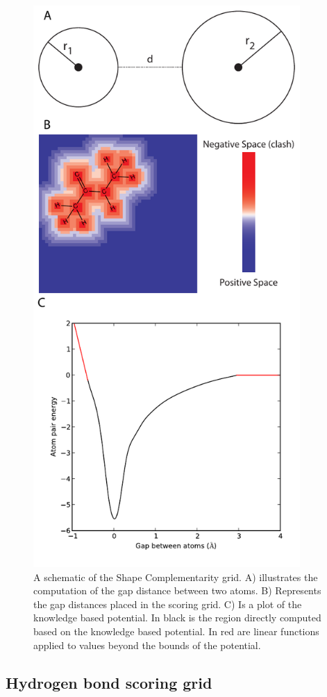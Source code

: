 \begin{figure}
\centering
\includegraphics[width=4in]{figures/lowres_appendix/Shape_Complementarity.pdf}
\caption{
A schematic of the Shape Complementarity grid.
A) illustrates the computation of the gap distance between two atoms.
B) Represents the gap distances placed in the scoring grid.
C) Is a plot of the knowledge based potential.
In black is the region directly computed based on the knowledge based potential.
In red are linear functions applied to values beyond the bounds of the potential.
}
\label{fig:shape_schematic}
\end{figure}

\subsection{Hydrogen bond scoring grid}

